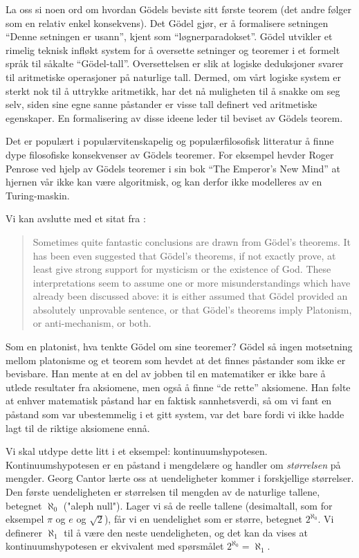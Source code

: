 \documentclass[12pt, norsk]{article}
\begin{document}
La oss si noen ord om hvordan Gödels beviste sitt første teorem (det andre følger som en relativ enkel konsekvens). Det Gödel gjør, er å formalisere setningen ``Denne setningen er usann'', kjent som ``løgnerparadokset''. Gödel utvikler et rimelig teknisk infløkt system for å oversette setninger og teoremer i et formelt språk til såkalte ``Gödel-tall''. Oversettelsen er slik at logiske deduksjoner svarer til aritmetiske operasjoner på naturlige tall. Dermed, om vårt logiske system er sterkt nok til å uttrykke aritmetikk, har det nå muligheten til å snakke om seg selv, siden sine egne sanne påstander er visse tall definert ved aritmetiske egenskaper. En formalisering av disse ideene leder til beviset av Gödels teorem.

Det er populært i populærvitenskapelig og populærfilosofisk litteratur å finne dype filosofiske konsekvenser av Gödels teoremer. For eksempel hevder Roger Penrose ved hjelp av Gödels teoremer i sin bok ``The Emperor's New Mind'' \cite{penrose_emperor} at hjernen vår ikke kan være algoritmisk, og kan derfor ikke modelleres av en Turing-maskin.

Vi kan avslutte med et sitat fra \cite{godel_online}:
\begin{quote}
Sometimes quite fantastic conclusions are drawn from Gödel's theorems. It has been even suggested that Gödel's theorems, if not exactly prove, at least give strong support for mysticism or the existence of God. These interpretations seem to assume one or more misunderstandings which have already been discussed above: it is either assumed that Gödel provided an absolutely unprovable sentence, or that Gödel's theorems imply Platonism, or anti-mechanism, or both.
\end{quote}

Som en platonist, hva tenkte Gödel om sine teoremer? Gödel så ingen motsetning mellom platonisme og et teorem som hevdet at det finnes påstander som ikke er bevisbare. Han mente at en del av jobben til en matematiker er ikke bare å utlede resultater fra aksiomene, men også å finne ``de rette'' aksiomene. Han følte at enhver matematisk påstand har en faktisk sannhetsverdi, så om vi fant en påstand som var ubestemmelig i et gitt system, var det bare fordi vi ikke hadde lagt til de riktige aksiomene ennå.

Vi skal utdype dette litt i et eksempel: kontinuumshypotesen. Kontinuumshypotesen er en påstand i mengdelære og handler om \emph{størrelsen} på mengder. Georg Cantor lærte oss at uendeligheter kommer i forskjellige størrelser. Den første uendeligheten er størrelsen til mengden av de naturlige tallene, betegnet $\aleph_0$ ("aleph null"). Lager vi så de reelle tallene (desimaltall, som for eksempel $\pi$ og $e$ og $\sqrt 2$), får vi en uendelighet som er større, betegnet $2^{\aleph_0}$. Vi definerer $\aleph_1$ til å være den neste uendeligheten, og det kan da vises at kontinuumshypotesen er ekvivalent med spørsmålet $2^{\aleph_0}=\aleph_1$. 
\end{document}
